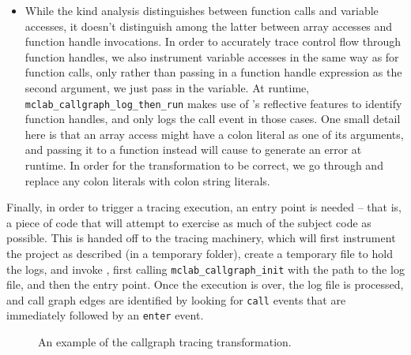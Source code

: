 \begin{itemize}
\item While the kind analysis distinguishes between function calls and variable
  accesses, it doesn't distinguish among the latter between array accesses and
  function handle invocations. In order to accurately trace control flow through
  function handles, we also instrument variable accesses in the same way as for
  function calls, only rather than passing in a function handle expression as
  the second argument, we just pass in the variable. At runtime,
  \texttt{mclab\_callgraph\_log\_then\_run} makes use of \matlab's reflective
  features to identify function handles, and only logs the call event in those
  cases. One small detail here is that an array access might have a colon
  literal as one of its arguments, and passing it to a function instead will
  cause \matlab to generate an error at runtime. In order for the
  transformation to be correct, we go through and replace any colon literals
  with colon string literals.

\end{itemize}

Finally, in order to trigger a tracing execution, an entry point is needed --
that is, a piece of code that will attempt to exercise as much of the subject
code as possible. This is handed off to the tracing machinery, which will first
instrument the project as described (in a temporary folder), create a temporary
file to hold the logs, and invoke \matlab, first calling
\texttt{mclab\_callgraph\_init} with the path to the log file, and then the
entry point. Once the execution is over, the log file is processed, and call
graph edges are identified by looking for \texttt{call} events that are
immediately followed by an \texttt{enter} event.

\begin{figure}[htbp]
  \begin{minipage}{\linewidth}

\end{minipage}
\begin{minipage}{\linewidth}

\end{minipage}
\caption{An example of the callgraph tracing transformation.}
\label{Fig:CallgraphBeforeAfter}
\end{figure}
